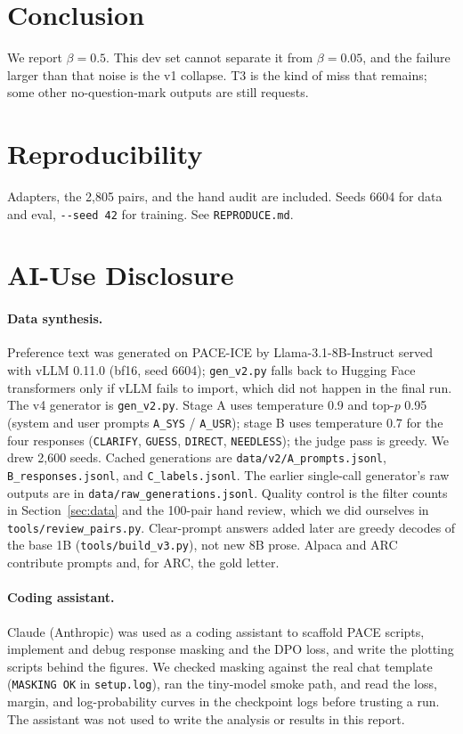 \documentclass[11pt]{article}
\begin{document}
\section{Conclusion}

We report $\beta{=}0.5$. This dev set cannot separate it from $\beta{=}0.05$, and the failure larger than that noise is the v1 collapse. T3 is the kind of miss that remains; some other no-question-mark outputs are still requests.

\section*{Reproducibility}

Adapters, the 2,805 pairs, and the hand audit are included. Seeds 6604 for data and eval, \verb|--seed 42| for training. See \texttt{REPRODUCE.md}.

\clearpage
\appendix
\section{AI-Use Disclosure}
\label{app:ai}

\paragraph{Data synthesis.}
Preference text was generated on PACE-ICE by Llama-3.1-8B-Instruct served with vLLM 0.11.0 (bf16, seed 6604); \texttt{gen\_v2.py} falls back to Hugging Face transformers only if vLLM fails to import, which did not happen in the final run.
The v4 generator is \texttt{gen\_v2.py}.
Stage A uses temperature 0.9 and top-$p$ 0.95 (system and user prompts \texttt{A\_SYS} / \texttt{A\_USR}); stage B uses temperature 0.7 for the four responses (\texttt{CLARIFY}, \texttt{GUESS}, \texttt{DIRECT}, \texttt{NEEDLESS}); the judge pass is greedy.
We drew 2,600 seeds.
Cached generations are \texttt{data/v2/A\_prompts.jsonl}, \texttt{B\_responses.jsonl}, and \texttt{C\_labels.jsonl}.
The earlier single-call generator's raw outputs are in \texttt{data/raw\_generations.jsonl}.
Quality control is the filter counts in Section~\ref{sec:data} and the 100-pair hand review, which we did ourselves in \texttt{tools/review\_pairs.py}.
Clear-prompt answers added later are greedy decodes of the base 1B (\texttt{tools/build\_v3.py}), not new 8B prose.
Alpaca and ARC contribute prompts and, for ARC, the gold letter.


\paragraph{Coding assistant.}
Claude (Anthropic) was used as a coding assistant to scaffold PACE scripts, implement and debug response masking and the DPO loss, and write the plotting scripts behind the figures.
We checked masking against the real chat template (\texttt{MASKING OK} in \texttt{setup.log}), ran the tiny-model smoke path, and read the loss, margin, and log-probability curves in the checkpoint logs before trusting a run.
The assistant was not used to write the analysis or results in this report.
\end{document}

